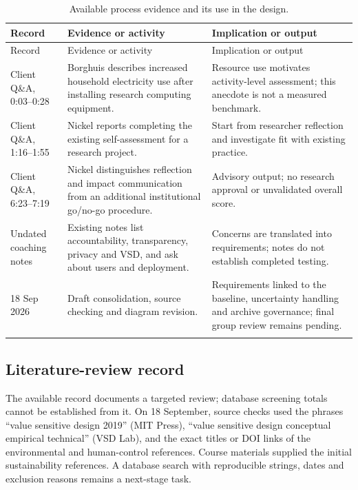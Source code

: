 \documentclass[11pt,a4paper]{article}
\begin{document}
\begin{longtable}{@{}p{}p{}p{}@{}}
\toprule
Record & Evidence or activity & Implication or output \\
\midrule\endfirsthead
\toprule Record & Evidence or activity & Implication or output \\
\midrule\endhead
Client Q\&A, 0:03--0:28 & Borghuis describes increased household electricity use after installing research computing equipment. & Resource use motivates activity-level assessment; this anecdote is not a measured benchmark. \\
\midrule
Client Q\&A, 1:16--1:55 & Nickel reports completing the existing self-assessment for a research project. & Start from researcher reflection and investigate fit with existing practice. \\
\midrule
Client Q\&A, 6:23--7:19 & Nickel distinguishes reflection and impact communication from an additional institutional go/no-go procedure. & Advisory output; no research approval or unvalidated overall score. \\
\midrule
Undated coaching notes & Existing notes list accountability, transparency, privacy and VSD, and ask about users and deployment. & Concerns are translated into requirements; notes do not establish completed testing. \\
\midrule
18 Sep 2026 & Draft consolidation, source checking and diagram revision. & Requirements linked to the baseline, uncertainty handling and archive governance; final group review remains pending. \\
\bottomrule
\caption{Available process evidence and its use in the design.}\\
\end{longtable}

\subsection*{Literature-review record}
The available record documents a targeted review; database screening totals cannot be established from it. On 18 September, source checks used the phrases ``value sensitive design 2019'' (MIT Press), ``value sensitive design conceptual empirical technical'' (VSD Lab), and the exact titles or DOI links of the environmental and human-control references. Course materials supplied the initial sustainability references. A database search with reproducible strings, dates and exclusion reasons remains a next-stage task.
\end{document}

